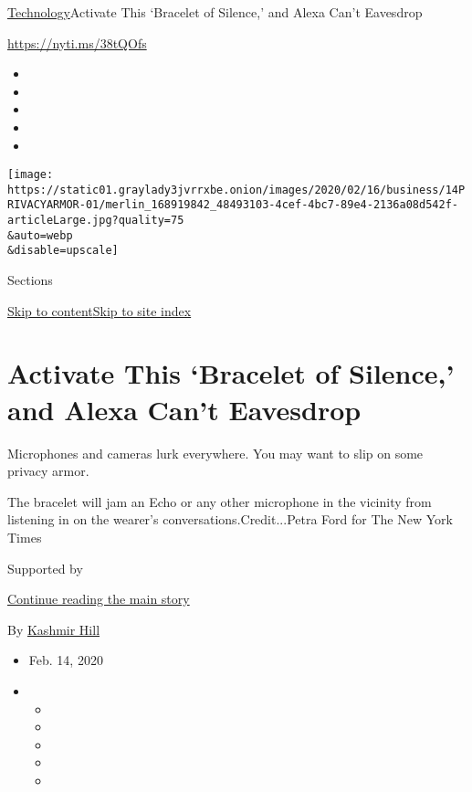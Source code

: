 \href{/section/technology}{Technology}\textbar{}Activate This `Bracelet
of Silence,' and Alexa Can't Eavesdrop

\href{https://nyti.ms/38tQOfs}{https://nyti.ms/38tQOfs}

\begin{itemize}
\item
\item
\item
\item
\item
\end{itemize}

\texttt{[image: https://static01.graylady3jvrrxbe.onion/images/2020/02/16/business/14PRIVACYARMOR-01/merlin\_168919842\_48493103-4cef-4bc7-89e4-2136a08d542f-articleLarge.jpg?quality=75\\\&auto=webp\\\&disable=upscale]}

Sections

\protect\hyperlink{site-content}{Skip to
content}\protect\hyperlink{site-index}{Skip to site index}

\hypertarget{activate-this-bracelet-of-silence-and-alexa-cant-eavesdrop}{%
\section{Activate This `Bracelet of Silence,' and Alexa Can't
Eavesdrop}\label{activate-this-bracelet-of-silence-and-alexa-cant-eavesdrop}}

Microphones and cameras lurk everywhere. You may want to slip on some
privacy armor.

The bracelet will jam an Echo or any other microphone in the vicinity
from listening in on the wearer's conversations.Credit...Petra Ford for
The New York Times

Supported by

\protect\hyperlink{after-sponsor}{Continue reading the main story}

By \href{https://www.nytimes3xbfgragh.onion/by/kashmir-hill}{Kashmir
Hill}

\begin{itemize}
\item
  Feb. 14, 2020
\item
  \begin{itemize}
  \item
  \item
  \item
  \item
  \item
  \end{itemize}
\end{itemize}


